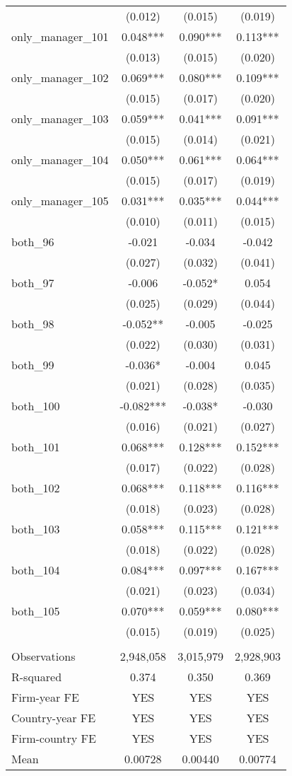\begin{tabular}{lccc}
 & (0.012) & (0.015) & (0.019) \\
only\_manager\_101 & 0.048*** & 0.090*** & 0.113*** \\
 & (0.013) & (0.015) & (0.020) \\
only\_manager\_102 & 0.069*** & 0.080*** & 0.109*** \\
 & (0.015) & (0.017) & (0.020) \\
only\_manager\_103 & 0.059*** & 0.041*** & 0.091*** \\
 & (0.015) & (0.014) & (0.021) \\
only\_manager\_104 & 0.050*** & 0.061*** & 0.064*** \\
 & (0.015) & (0.017) & (0.019) \\
only\_manager\_105 & 0.031*** & 0.035*** & 0.044*** \\
 & (0.010) & (0.011) & (0.015) \\
both\_96 & -0.021 & -0.034 & -0.042 \\
 & (0.027) & (0.032) & (0.041) \\
both\_97 & -0.006 & -0.052* & 0.054 \\
 & (0.025) & (0.029) & (0.044) \\
both\_98 & -0.052** & -0.005 & -0.025 \\
 & (0.022) & (0.030) & (0.031) \\
both\_99 & -0.036* & -0.004 & 0.045 \\
 & (0.021) & (0.028) & (0.035) \\
both\_100 & -0.082*** & -0.038* & -0.030 \\
 & (0.016) & (0.021) & (0.027) \\
both\_101 & 0.068*** & 0.128*** & 0.152*** \\
 & (0.017) & (0.022) & (0.028) \\
both\_102 & 0.068*** & 0.118*** & 0.116*** \\
 & (0.018) & (0.023) & (0.028) \\
both\_103 & 0.058*** & 0.115*** & 0.121*** \\
 & (0.018) & (0.022) & (0.028) \\
both\_104 & 0.084*** & 0.097*** & 0.167*** \\
 & (0.021) & (0.023) & (0.034) \\
both\_105 & 0.070*** & 0.059*** & 0.080*** \\
 & (0.015) & (0.019) & (0.025) \\
 &  &  &  \\
Observations & 2,948,058 & 3,015,979 & 2,928,903 \\
R-squared & 0.374 & 0.350 & 0.369 \\
Firm-year FE & YES & YES & YES \\
Country-year FE & YES & YES & YES \\
Firm-country FE & YES & YES & YES \\
 Mean & 0.00728 & 0.00440 & 0.00774 \\ \hline
\end{tabular}
